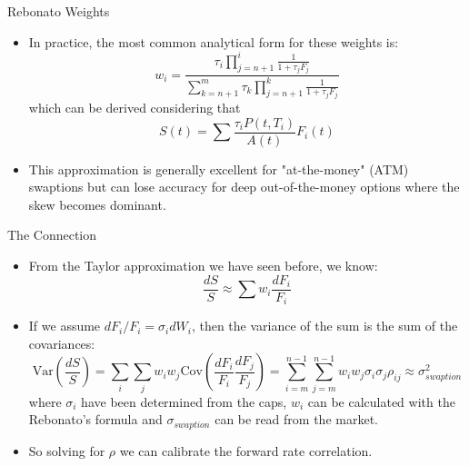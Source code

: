 \documentclass{beamer}
\begin{document}
\begin{frame}{Rebonato Weights}
	\begin{itemize}
		\item In practice, the most common analytical form for these weights is:
		\begin{equation*}
			w_i=\frac{\tau_i \prod_{j=n+1}^{i}\frac{1}{1+\tau_j F_j}}{\sum_{k=n+1}^{m}\tau_k\prod_{j=n+1}^{k}\frac{1}{1+\tau_jF_j}}
		\end{equation*}
		which can be derived considering that
		\begin{equation*}
			S(t) = \sum\frac{\tau_iP(t, T_i)}{A(t)}F_i(t)
		\end{equation*}
		\item This approximation is generally excellent for "at-the-money" (ATM) swaptions but can lose accuracy for deep out-of-the-money options where the skew becomes dominant.
	\end{itemize}
\end{frame}

\begin{frame}{The Connection}
	\begin{itemize}
		\item From the Taylor approximation we have seen before, we know:
		\begin{equation*}
			\frac{dS}{S} \approx \sum w_i \frac{dF_i}{F_i}
		\end{equation*}
		\item If we assume $dF_i/F_i=\sigma_i dW_i$, then the variance of the sum is the sum of the covariances:
		\begin{equation*}
			\text{Var}\left(\frac{dS}{S}\right) = \sum_i \sum_j w_i w_j \text{Cov} \left(\frac{dF_i}{F_i}\frac{dF_j}{F_j}\right) =
			\sum_{i=m}^{n-1} \sum_{j=m}^{n-1} w_i w_j \sigma_i \sigma_j \rho_{ij} \approx \sigma_{swaption}^2
		\end{equation*}
		where $\sigma_i$ have been determined from the caps, $w_i$ can be calculated with the Rebonato's formula and $\sigma_{swaption}$ can be read from the market.
		\item So solving for $\rho$ we can calibrate the forward rate correlation.
	\end{itemize}
\end{frame}
\end{document}

